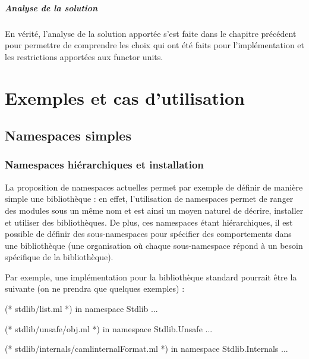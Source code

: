 \documentclass[11pt,a4paper]{report}
\begin{document}
\paragraph{Analyse de la solution}

En vérité, l'analyse de la solution apportée s'est faite dans le chapitre
précédent pour permettre de comprendre les choix qui ont été faits pour
l'implémentation et les restrictions apportées aux functor units.

\chapter{Exemples et cas d'utilisation}

\section{Namespaces simples}

\subsection{Namespaces hiérarchiques et installation}

La proposition de namespaces actuelles permet par exemple de définir de manière
simple une bibliothèque : en effet, l'utilisation de namespaces permet de ranger
des modules sous un même nom et est ainsi un moyen naturel de décrire, installer
et utiliser des bibliothèques. De plus, ces namespaces étant hiérarchiques, il
est possible de définir des sous-namespaces pour spécifier des comportements dans
une bibliothèque (une organisation où chaque sous-namespace répond à un besoin
spécifique de la bibliothèque).

Par exemple, une implémentation pour la bibliothèque standard pourrait être la
suivante (on ne prendra que quelques exemples) :
\begin{OCaml}
(* stdlib/list.ml *)
in namespace Stdlib
...
\end{OCaml}

\begin{OCaml}
(* stdlib/unsafe/obj.ml *)
in namespace Stdlib.Unsafe
...
\end{OCaml}

\begin{OCaml}
(* stdlib/internals/camlinternalFormat.ml *)
in namespace Stdlib.Internals
...
\end{OCaml}
\end{document}

